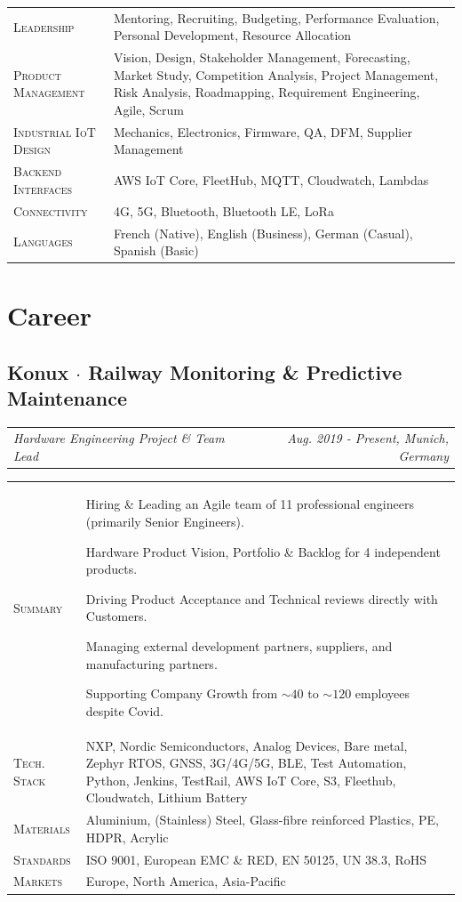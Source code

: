 \documentclass[10pt,a4paper]{moderncv}
\newcommand*{\makecareersubsection}[5]{
  \subsection{#1 {\color{color2}$\cdot$ #2}}
  \addvspace{-0.5em}
  {\color{color2}
  \begin{tabularx}{\textwidth}{LR}
    {\itshape #3} & {\itshape #4, #5}
  \end{tabularx}}
  \par\addvspace{1em}
  }
\begin{document}
  \begin{tabularx}{\textwidth}{>{\scshape}l@{\hskip 3.5mm}L}
    Leadership & Mentoring, Recruiting, Budgeting, Performance Evaluation, Personal Development, Resource Allocation\\
    Product Management & Vision, Design, Stakeholder Management, Forecasting, Market Study, Competition Analysis, Project Management, Risk Analysis, Roadmapping, Requirement Engineering, Agile, Scrum\\
    Industrial IoT Design & Mechanics, Electronics, Firmware, QA, DFM, Supplier Management\\
    Backend Interfaces & AWS IoT Core, FleetHub, MQTT, Cloudwatch,  Lambdas\\
    Connectivity & 4G, 5G, Bluetooth, Bluetooth LE, LoRa\\
    Languages & French (Native), English (Business), German (Casual), Spanish (Basic)
  \end{tabularx}

\section{Career}

\makecareersubsection{Konux}{Railway Monitoring \& Predictive Maintenance}
  {Hardware Engineering Project \& Team Lead}
  {Aug. 2019 - Present}
  {Munich, Germany}

  \begin{tabularx}{\textwidth}{>{\scshape}l@{\hskip 3.5mm}L}
    Summary & Hiring \& Leading an Agile team of 11 professional engineers (primarily Senior Engineers).
    \par Hardware Product Vision, Portfolio \& Backlog for 4 independent products.
    \par Driving Product Acceptance and Technical reviews directly with Customers.
    \par Managing external development partners, suppliers, and manufacturing partners.
    \par Supporting Company Growth from $\sim 40$ to $\sim 120$ employees despite Covid.\\
    Tech. Stack & NXP, Nordic Semiconductors, Analog Devices, Bare metal, Zephyr RTOS, GNSS, 3G/4G/5G, BLE, Test Automation, Python, Jenkins, TestRail, AWS IoT Core, S3, Fleethub, Cloudwatch, Lithium Battery\\
    Materials &  Aluminium, (Stainless) Steel, Glass-fibre reinforced Plastics, PE, HDPR, Acrylic\\
    Standards & ISO 9001, European EMC \& RED, EN 50125, UN 38.3, RoHS\\
    Markets & Europe, North America, Asia-Pacific\\
  \end{tabularx}
\end{document}
